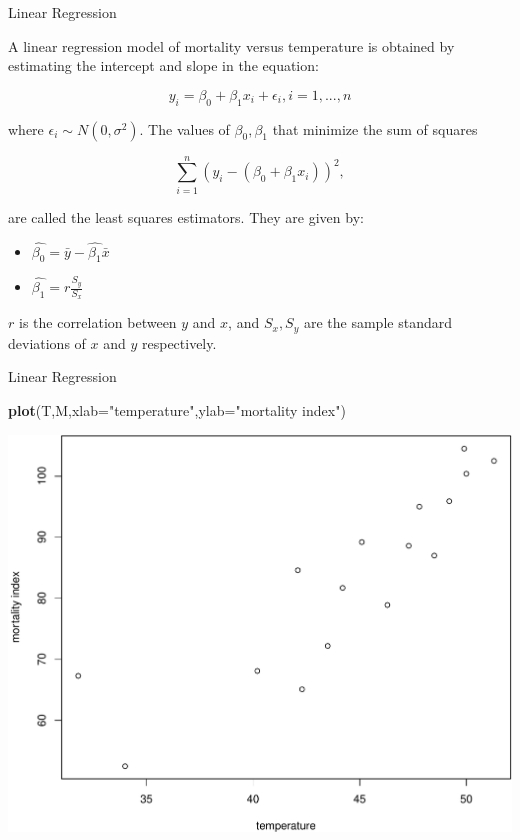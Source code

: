 \documentclass[9pt,ignorenonframetext,]{beamer}
\newenvironment{Shaded}{\begin{snugshade}}{\end{snugshade}}
\newcommand{\KeywordTok}[1]{\textcolor[rgb]{0.13,0.29,0.53}{\textbf{{#1}}}}
\newcommand{\DataTypeTok}[1]{\textcolor[rgb]{0.13,0.29,0.53}{{#1}}}
\newcommand{\StringTok}[1]{\textcolor[rgb]{0.31,0.60,0.02}{{#1}}}
\newcommand{\NormalTok}[1]{{#1}}
\providecommand{\tightlist}{%
\setlength{\itemsep}{0pt}\setlength{\parskip}{0pt}}
\begin{document}
\begin{frame}{Linear Regression}

A linear regression model of mortality versus temperature is obtained by
estimating the intercept and slope in the equation:

\[ y_i = \beta_0 + \beta_1 x_i + \epsilon_i, i=1,...,n\]

where \(\epsilon_i \sim N(0,\sigma^2)\). The values of
\(\beta_0, \beta_1\) that minimize the sum of squares

\[ \sum_{i=1}^{n} (y_i-(\beta_0+\beta_1 x_i))^2, \]

are called the least squares estimators. They are given by:

\begin{itemize}
\tightlist
\item
  \(\hat{\beta_0}={\bar y}-{\hat{\beta_1}}{\bar{x}}\)
\item
  \({\hat{\beta_1}}=r\frac{S_y}{S_x}\)
\end{itemize}

\(r\) is the correlation between \(y\) and \(x\), and \(S_x, S_y\) are
the sample standard deviations of \(x\) and \(y\) respectively.

\end{frame}

\begin{frame}[fragile]{Linear Regression}

\begin{Shaded}
\begin{Highlighting}[]
\KeywordTok{plot}\NormalTok{(T,M,}\DataTypeTok{xlab=}\StringTok{"temperature"}\NormalTok{,}\DataTypeTok{ylab=}\StringTok{"mortality index"}\NormalTok{)}
\end{Highlighting}
\end{Shaded}

\includegraphics{class2-jan11_files/figure-beamer/unnamed-chunk-15-1.pdf}

\end{frame}
\end{document}
